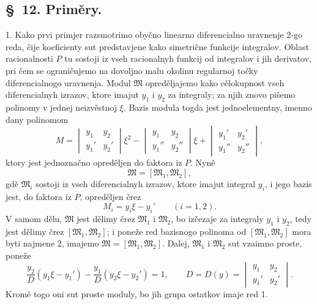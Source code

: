 \documentclass[11pt]{article}
\begin{document}

\setcounter{footnote}{23}
\subsection*{\S~12. Priměry.}

1. Kako prvi primjer razsmotrimo obyčno linearno diferencialno uravnenje 2-go reda, čije koeficienty sut predstavjene kako simetrične funkcije integralov. Oblast racionalnosti \(P\) tu sostoji iz vseh racionalnyh funkcij od integralov i jih derivatov, pri čem se ograničujemo na dovoljno malu okolinu regularnoj točky diferencialnogo uravnenja. Modul \(\mathfrak M\) opreděljajemo kako cělokupnost vseh diferencialnyh izrazov, ktore imajut \(y_1\) i \(y_2\) za integraly; za njih znovo pišemo polinomy v jednej neizvěstnoj \(\xi\). Bazis modula togda jest jednoelementny, imenno dany polinomom
\[
 M=
 \begin{vmatrix} y_1&y_2\\ y_1'&y_2'\end{vmatrix}\xi^2
 -\begin{vmatrix} y_1&y_2\\ y_1''&y_2''\end{vmatrix}\xi
 +\begin{vmatrix} y_1'&y_2'\\ y_1''&y_2''\end{vmatrix},
\]
ktory jest jednoznačno opreděljen do faktora iz \(P\). Nyně
\begin{equation}
 \mathfrak M=[\mathfrak M_1,
\mathfrak M_2],
\tag{41}
\end{equation}
gdě \(\mathfrak M_i\) sostoji iz vseh diferencialnyh izrazov, ktore imajut integral \(y_i\), i jego bazis jest, do faktora iz \(P\), opreděljen črez
\[
 M_i=y_i\xi-y_i'\qquad(i=1,2).
\]
V samom dělu, \(\mathfrak M\) jest dělimy črez \(\mathfrak M_1\) i \(\mathfrak M_2\), bo izčezaje za integraly \(y_1\) i \(y_2\), tedy jest dělimy črez \([\mathfrak M_1,
\mathfrak M_2]\); i poneže red bazisnogo polinoma od \([\mathfrak M_1,
\mathfrak M_2]\) mora byti najmene 2, imajemo \(\mathfrak M=[\mathfrak M_1,
\mathfrak M_2]\). Dalej, \(\mathfrak M_1\) i \(\mathfrak M_2\) sut vzaimno proste, poneže
\begin{equation}
 \frac{y_2}{D}(y_1\xi-y_1')-\frac{y_1}{D}(y_2\xi-y_2')=1,
 \qquad
 D=D(y)=\begin{vmatrix}y_1&y_2\\ y_1'&y_2'\end{vmatrix}.
\tag{42}
\end{equation}
Kromě togo oni sut proste moduly, bo jih grupa ostatkov imaje red 1.
\end{document}
